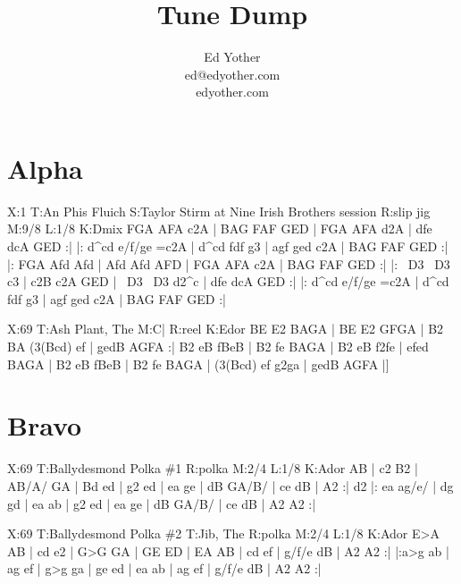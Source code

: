 \documentclass[letterpaper]{article}
\title{Tune Dump}
\author{Ed Yother\\ed@edyother.com\\edyother.com}
\begin{document}
\maketitle
	
\tableofcontents

\newpage
{}
\section{Alpha}

\begin{abc}[name]
X:1
T:An Phis Fluich
S:Taylor Stirm at Nine Irish Brothers session
R:slip jig
M:9/8
L:1/8
K:Dmix
FGA AFA c2A | BAG FAF GED | FGA AFA d2A | dfe dcA GED :|
|: d^cd e/f/ge =c2A | d^cd fdf g3 | agf ged c2A | BAG FAF GED :|
|: FGA Afd Afd | Afd Afd AFD | FGA AFA c2A | BAG FAF GED :|
|: ~D3 ~D3 c3 | c2B c2A GED | ~D3 ~D3 d2^c | dfe dcA GED :|
|: d^cd e/f/ge =c2A | d^cd fdf g3 | agf ged c2A | BAG FAF GED :|
\end{abc}

\begin{abc}[name]
X:69
T:Ash Plant, The
M:C|
R:reel
K:Edor
BE E2 BAGA | BE E2 GFGA | B2 BA (3(Bcd) ef | gedB AGFA :|
B2 eB fBeB | B2 fe BAGA | B2 eB f2fe | efed BAGA |
B2 eB fBeB | B2 fe BAGA | (3(Bcd) ef g2ga | gedB AGFA |]
\end{abc}

\section{Bravo}

\begin{abc}[name]
X:69
T:Ballydesmond Polka \#1
R:polka
M:2/4
L:1/8
K:Ador
AB | c2 B2 | AB/A/ GA | Bd ed | g2 ed |
ea ge | dB GA/B/ | ce dB | A2 :|
d2 |: ea ag/e/ | dg gd | ea ab | g2 ed |
ea ge | dB GA/B/ | ce dB | A2 A2 :|
\end{abc}

\begin{abc}[name]
X:69
T:Ballydesmond Polka \#2
T:Jib, The
R:polka
M:2/4
L:1/8
K:Ador
E>A AB | cd e2 | G>G GA | GE ED |
EA AB | cd ef | g/f/e dB | A2 A2 :|
|:a>g ab | ag ef | g>g ga | ge ed |
ea ab | ag ef | g/f/e dB | A2 A2 :|
\end{abc}
\end{document}

